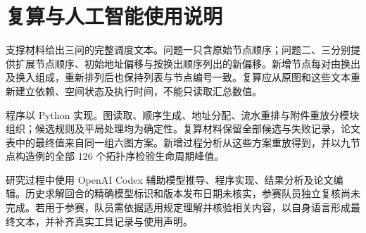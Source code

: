 \section{复算与人工智能使用说明}
支撑材料给出三问的完整调度文本。问题一只含原始节点顺序；问题二、三分别提供扩展节点顺序、初始地址偏移与按换出顺序列出的新偏移。新增节点每对由换出及换入组成，重新排列后也保持列表与节点编号一致。复算应从原图和这些文本重新建立依赖、空间状态及执行时间，不能只读取汇总数值。

程序以 Python 实现。图读取、顺序生成、地址分配、流水重排与附件重放分模块组织；候选规则及平局处理均为确定性。复算材料保留全部候选与失败记录，论文表中的最终值来自同一组六图方案。新增过程分析从这些方案重放得到，并以九节点构造例的全部 126 个拓扑序检验生命周期峰值。

研究过程中使用 OpenAI Codex 辅助模型推导、程序实现、结果分析及论文编辑。历史求解回合的精确模型标识和版本发布日期未核实，参赛队员独立复核尚未完成。若用于参赛，队员需依据适用规定理解并核验相关内容，以自身语言形成最终文本，并补齐真实工具记录与使用声明\cite{ai}。
